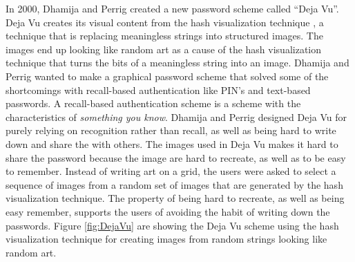   In 2000, Dhamija and Perrig \cite{DejaVu} created a new password scheme called ``Deja Vu''. Deja Vu creates its visual content from the hash visualization technique \cite{HashVisualization}, a technique that is replacing meaningless strings into structured images. The images end up looking like random art as a cause of the hash visualization technique that turns the bits of a meaningless string into an image. Dhamija and Perrig wanted to make a graphical password scheme that solved some of the shortcomings with recall-based authentication like PIN's and text-based passwords. A recall-based authentication scheme is a scheme with the characteristics of {\it something you know}. Dhamija and Perrig designed Deja Vu for purely relying on recognition rather than recall, as well as being hard to write down and share the with others. The images used in Deja Vu makes it hard to share the password because the image are hard to recreate, as well as to be easy to remember. Instead of writing art on a grid, the users were asked to select a sequence of images from a random set of images that are generated by the hash visualization technique. The property of being hard to recreate, as well as being easy remember, supports the users of avoiding the habit of writing down the passwords. Figure \ref{fig:DejaVu} are showing the Deja Vu scheme using the hash visualization technique for creating images from random strings looking like random art.

